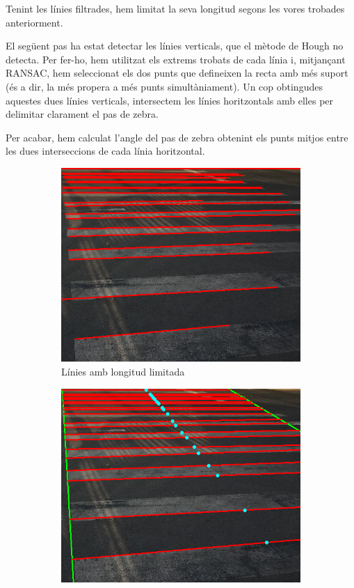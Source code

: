 \documentclass[10pt,a4paper,twocolumn,twoside]{article}
\begin{document}
Tenint les línies filtrades, hem limitat la seva longitud segons les vores trobades anteriorment.

El següent pas ha estat detectar les línies verticals, que el mètode de Hough no detecta. Per fer-ho, hem utilitzat els extrems trobats de cada línia i, mitjançant RANSAC, hem seleccionat els dos punts que defineixen la recta amb més suport (és a dir, la més propera a més punts simultàniament). Un cop obtingudes aquestes dues línies verticals, intersectem les línies horitzontals amb elles per delimitar clarament el pas de zebra.

Per acabar, hem calculat l’angle del pas de zebra obtenint els punts mitjos entre les dues interseccions de cada línia horitzontal. 
\begin{figure}[h]
	\centering
	\begin{subfigure}{0.46\columnwidth}
		\includegraphics[width=\linewidth]{figs/limit}
		\caption{Línies amb longitud limitada}
	\end{subfigure}
	\quad
	\begin{subfigure}{0.46\columnwidth}
		\includegraphics[width=\linewidth]{figs/mid_points}

\end{subfigure}
\end{figure}
\end{document}
